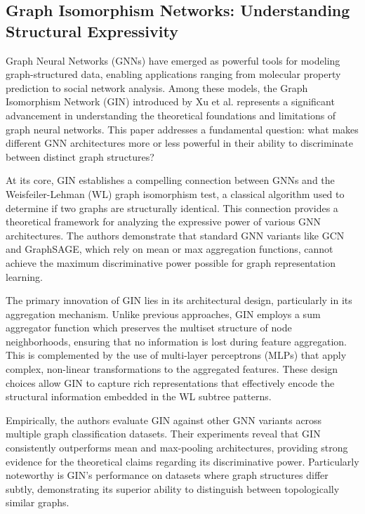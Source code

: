 \documentclass[a4paper, 11pt, twoside, openright]{report}
\begin{document}
\subsection{Graph Isomorphism Networks: Understanding Structural Expressivity}

Graph Neural Networks (GNNs) have emerged as powerful tools for modeling graph-structured data, enabling applications ranging from molecular property prediction to social network analysis. Among these models, the Graph Isomorphism Network (GIN) introduced by Xu et al. represents a significant advancement in understanding the theoretical foundations and limitations of graph neural networks. This paper addresses a fundamental question: what makes different GNN architectures more or less powerful in their ability to discriminate between distinct graph structures?

At its core, GIN establishes a compelling connection between GNNs and the Weisfeiler-Lehman (WL) graph isomorphism test, a classical algorithm used to determine if two graphs are structurally identical. This connection provides a theoretical framework for analyzing the expressive power of various GNN architectures. The authors demonstrate that standard GNN variants like GCN and GraphSAGE, which rely on mean or max aggregation functions, cannot achieve the maximum discriminative power possible for graph representation learning.

The primary innovation of GIN lies in its architectural design, particularly in its aggregation mechanism. Unlike previous approaches, GIN employs a sum aggregator function which preserves the multiset structure of node neighborhoods, ensuring that no information is lost during feature aggregation. This is complemented by the use of multi-layer perceptrons (MLPs) that apply complex, non-linear transformations to the aggregated features. These design choices allow GIN to capture rich representations that effectively encode the structural information embedded in the WL subtree patterns.

Empirically, the authors evaluate GIN against other GNN variants across multiple graph classification datasets. Their experiments reveal that GIN consistently outperforms mean and max-pooling architectures, providing strong evidence for the theoretical claims regarding its discriminative power. Particularly noteworthy is GIN's performance on datasets where graph structures differ subtly, demonstrating its superior ability to distinguish between topologically similar graphs.
\end{document}
